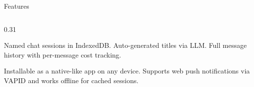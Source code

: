 \documentclass[aspectratio=169, 10pt]{beamer}
\begin{document}
\begin{frame}{Features}
\begin{columns}[T]
    \begin{column}{0.31\textwidth}
      \begin{tcolorbox}[featurebox, title={\faHistory\ \ Session Management}]
        \scriptsize
        Named chat sessions in IndexedDB. Auto-generated titles via LLM.
        Full message history with per-message cost tracking.
      \end{tcolorbox}\vspace{0.4em}

      \begin{tcolorbox}[featurebox, title={\faMobile\ \ PWA Support}]
        \scriptsize
        Installable as a native-like app on any device. Supports web push
        notifications via VAPID and works offline for cached sessions.
      \end{tcolorbox}
    \end{column}
  \end{columns}
\end{frame}
\end{document}
